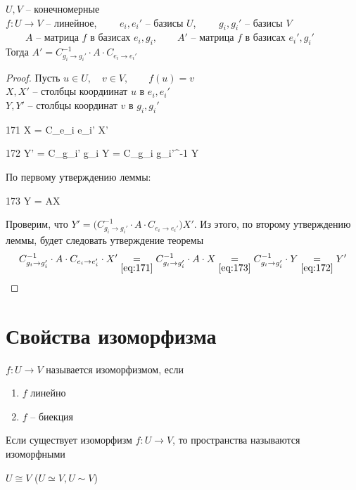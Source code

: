 \begin{theorem}
	$ U, V $ -- конечномерные \\
	$ f : U \to V $ -- линейное, $ \qquad e_i, e_i' $ -- базисы $ U $, $ \qquad g_i, g_i' $ -- базисы $ V $ \\
	$ \qquad A $ -- матрица $f$ в базисах $ e_i, g_i, \qquad A' $ -- матрица $ f $ в базисах $ e_i', g_i' $ \\
    Тогда $ A' = C_{g_i \to g_i'}^{-1} \cdot A \cdot C_{e_i \to e_i'} $
\end{theorem}

\begin{proof}
	Пусть $ u \in U, \quad v \in V, \qquad f(u) = v $ \\
    $ X, X' $ -- столбцы коордиинат $ u $ в $ e_i, e_i' $ \\
    $ Y, Y' $ -- столбцы координат $ v $ в $ g_i, g_i' $
	\begin{equ}{171}
		X = C_{e_i \to e_i'} X'
	\end{equ}
	\begin{equ}{172}
		Y' = C_{g_i' \to g_i} Y = C_{g_i \to g_i'}^{-1} Y
	\end{equ}
	По первому утверждению леммы:
	\begin{equ}{173}
		Y = AX
	\end{equ}
	Проверим, что $ Y' = \bigg( C_{g_i \to g_i'}^{-1} \cdot A \cdot C_{e_i \to e_i'} \bigg)X' $. Из этого, по второму утверждению леммы, будет следовать утверждение теоремы
	$$ C_{g_i \to g_i'}^{-1} \cdot A \cdot C_{e_i \to e_i'} \cdot X' \underset{\eref{171}}= C_{g_i \to g_i'}^{-1} \cdot A \cdot X \underset{\eref{173}}= C_{g_i \to g_i'}^{-1} \cdot Y \underset{\eref{172}}= Y' $$
\end{proof}

\section{Свойства изоморфизма}

\begin{definition}
	$ f : U \to V $ называется изоморфизмом, если
    \begin{enumerate}
    	\item $f$ линейно
        \item $f$ -- биекция
    \end{enumerate}
    Если существует изоморфизм $ f : U \to V $, то пространства называются изоморфными
    \begin{notation}
    	$ U \cong V $ ($U \simeq V, U \sim V $)
    \end{notation}
\end{definition}

